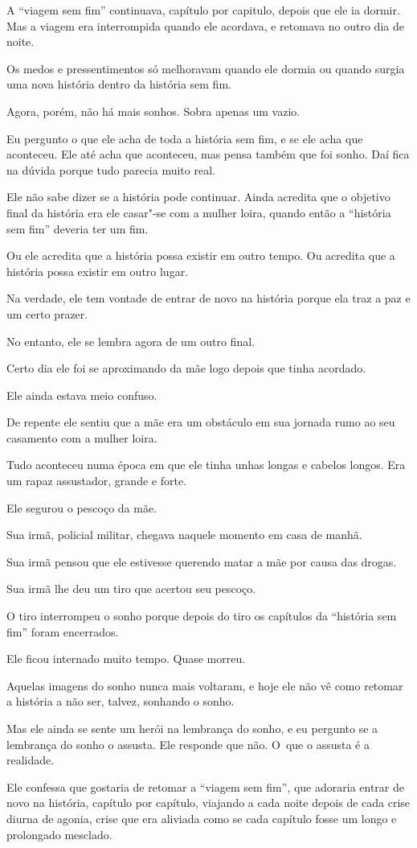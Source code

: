  

A ``viagem sem fim'' continuava, capítulo por capitulo, depois que ele
ia dormir. Mas a viagem era interrompida quando ele acordava, e retomava
no outro dia de noite.

Os medos e pressentimentos só melhoravam quando ele dormia ou quando
surgia uma nova história dentro da história sem fim.

Agora, porém, não há mais sonhos. Sobra apenas um vazio.

Eu pergunto o que ele acha de toda a história sem fim, e se ele acha que
aconteceu. Ele até acha que aconteceu, mas pensa também que foi sonho.
Daí fica na dúvida porque tudo parecia muito real.

Ele não sabe dizer se a história pode continuar. Ainda acredita que o
objetivo final da história era ele casar"-se com a mulher loira, quando
então a ``história sem fim'' deveria ter um fim.

Ou ele acredita que a história possa existir em outro tempo. Ou acredita
que a história possa existir em outro lugar.

Na verdade, ele tem vontade de entrar de novo na história porque ela traz
a paz e um certo prazer.

No entanto, ele se lembra agora de um outro final.

Certo dia ele foi se aproximando da mãe logo depois que tinha acordado.

Ele ainda estava meio confuso.

De repente ele sentiu que a mãe era um obstáculo em sua jornada rumo ao
seu casamento com a mulher loira.

Tudo aconteceu numa época em que ele tinha unhas longas e cabelos
longos. Era um rapaz assustador, grande e forte.

Ele segurou o pescoço da mãe.

Sua irmã, policial militar, chegava naquele momento em casa de manhã.

Sua irmã pensou que ele estivesse querendo matar a mãe por causa das
drogas.

Sua irmã lhe deu um tiro que acertou seu pescoço.

O tiro interrompeu o sonho porque depois do tiro os capítulos da
``história sem fim'' foram encerrados.

Ele ficou internado muito tempo. Quase morreu.

Aquelas imagens do sonho nunca mais voltaram, e hoje ele não vê como
retomar a história a não ser, talvez, sonhando o sonho.

Mas ele ainda se sente um herói na lembrança do sonho, e eu pergunto se
a lembrança do sonho o assusta. Ele responde que não. O~que o assusta é
a realidade.

Ele confessa que gostaria de retomar a ``viagem sem fim'', que adoraria
entrar de novo na história, capítulo por capítulo, viajando a cada noite
depois de cada crise diurna de agonia, crise que era aliviada como se
cada capítulo fosse um longo e prolongado mesclado. ~

\subsubsection{}
